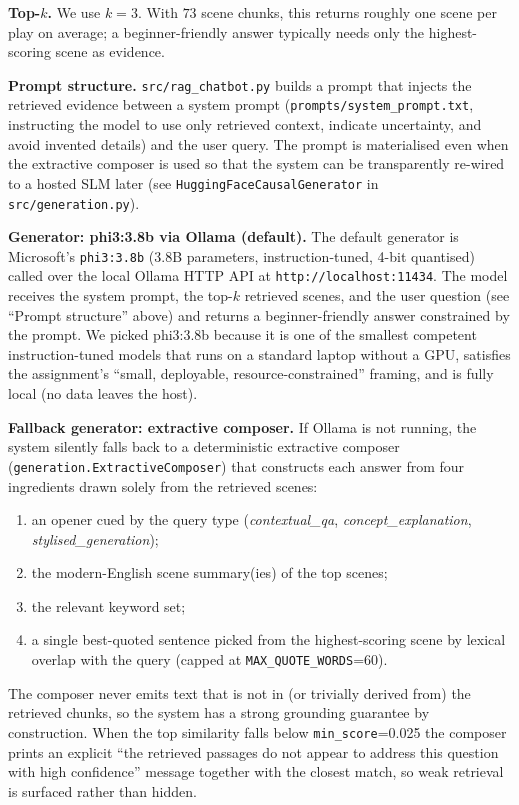 \documentclass[10pt,twocolumn,a4paper]{article}
\begin{document}
\textbf{Top-$k$.} We use $k = 3$. With $73$ scene chunks, this returns
roughly one scene per play on average; a beginner-friendly answer
typically needs only the highest-scoring scene as evidence.

\textbf{Prompt structure.} \verb|src/rag_chatbot.py| builds a prompt
that injects the retrieved evidence between a system prompt
(\verb|prompts/system_prompt.txt|, instructing the model to use only
retrieved context, indicate uncertainty, and avoid invented details)
and the user query. The prompt is materialised even when the
extractive composer is used so that the system can be transparently
re-wired to a hosted SLM later (see \verb|HuggingFaceCausalGenerator|
in \verb|src/generation.py|).

\textbf{Generator: phi3:3.8b via Ollama (default).} The default
generator is Microsoft's \texttt{phi3:3.8b} (3.8B parameters,
instruction-tuned, 4-bit quantised) called over the local Ollama HTTP
API at \verb|http://localhost:11434|. The model receives the system
prompt, the top-$k$ retrieved scenes, and the user question (see
``Prompt structure'' above) and returns a beginner-friendly answer
constrained by the prompt. We picked phi3:3.8b because it is one of
the smallest competent instruction-tuned models that runs on a
standard laptop without a GPU, satisfies the assignment's
``small, deployable, resource-constrained'' framing, and is fully
local (no data leaves the host).

\textbf{Fallback generator: extractive composer.} If Ollama is not
running, the system silently falls back to a deterministic extractive
composer (\verb|generation.ExtractiveComposer|) that constructs each
answer from four ingredients drawn solely from the retrieved scenes:

\begin{enumerate}
    \item an opener cued by the query type
        (\emph{contextual\_qa}, \emph{concept\_explanation},
        \emph{stylised\_generation});
    \item the modern-English scene summary(ies) of the top scenes;
    \item the relevant keyword set;
    \item a single best-quoted sentence picked from the highest-scoring
        scene by lexical overlap with the query (capped at
        \verb|MAX_QUOTE_WORDS|=60).
\end{enumerate}

The composer never emits text that is not in (or trivially derived
from) the retrieved chunks, so the system has a strong grounding
guarantee by construction. When the top similarity falls below
\verb|min_score|=0.025 the composer prints an explicit
``the retrieved passages do not appear to address this question with
high confidence'' message together with the closest match, so weak
retrieval is surfaced rather than hidden.
\end{document}

